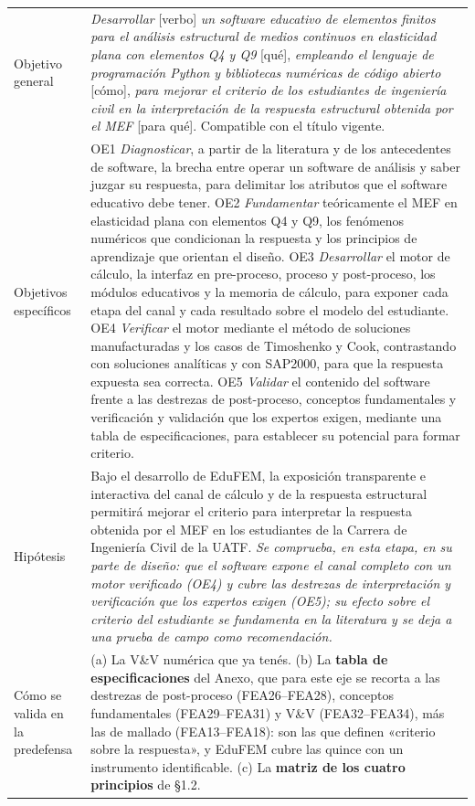 \documentclass[11pt,a4paper]{article}
\begin{document}
\begin{longtable}{L{3.4cm}L{12.4cm}}
Objetivo general & \emph{Desarrollar} [verbo] \emph{un software educativo de elementos finitos para el análisis estructural de medios continuos en elasticidad plana con elementos Q4 y Q9} [qué], \emph{empleando el lenguaje de programación Python y bibliotecas numéricas de código abierto} [cómo], \emph{para mejorar el criterio de los estudiantes de ingeniería civil en la interpretación de la respuesta estructural obtenida por el MEF} [para qué]. Compatible con el título vigente. \\
Objetivos específicos & OE1 \emph{Diagnosticar}, a partir de la literatura y de los antecedentes de software, la brecha entre operar un software de análisis y saber juzgar su respuesta, para delimitar los atributos que el software educativo debe tener. OE2 \emph{Fundamentar} teóricamente el MEF en elasticidad plana con elementos Q4 y Q9, los fenómenos numéricos que condicionan la respuesta y los principios de aprendizaje que orientan el diseño. OE3 \emph{Desarrollar} el motor de cálculo, la interfaz en pre-proceso, proceso y post-proceso, los módulos educativos y la memoria de cálculo, para exponer cada etapa del canal y cada resultado sobre el modelo del estudiante. OE4 \emph{Verificar} el motor mediante el método de soluciones manufacturadas y los casos de Timoshenko y Cook, contrastando con soluciones analíticas y con SAP2000, para que la respuesta expuesta sea correcta. OE5 \emph{Validar} el contenido del software frente a las destrezas de post-proceso, conceptos fundamentales y verificación y validación que los expertos exigen, mediante una tabla de especificaciones, para establecer su potencial para formar criterio. \\
Hipótesis & Bajo el desarrollo de EduFEM, la exposición transparente e interactiva del canal de cálculo y de la respuesta estructural permitirá mejorar el criterio para interpretar la respuesta obtenida por el MEF en los estudiantes de la Carrera de Ingeniería Civil de la UATF. \emph{Se comprueba, en esta etapa, en su parte de diseño: que el software expone el canal completo con un motor verificado (OE4) y cubre las destrezas de interpretación y verificación que los expertos exigen (OE5); su efecto sobre el criterio del estudiante se fundamenta en la literatura y se deja a una prueba de campo como recomendación.} \\
Cómo se valida en la predefensa & (a) La V\&V numérica que ya tenés. (b) La \textbf{tabla de especificaciones} del Anexo, que para este eje se recorta a las destrezas de post-proceso (FEA26--FEA28), conceptos fundamentales (FEA29--FEA31) y V\&V (FEA32--FEA34), más las de mallado (FEA13--FEA18): son las que definen «criterio sobre la respuesta», y EduFEM cubre las quince con un instrumento identificable. (c) La \textbf{matriz de los cuatro principios} de §1.2. \\

\end{longtable}
\end{document}
